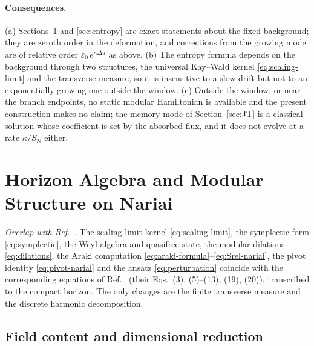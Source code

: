 \documentclass[11pt]{article}
\newcommand{\Nariai}{Nariai}
\begin{document}
\paragraph{Consequences.} (a) Sections~\ref{sec:algebra} and \ref{sec:entropy} are exact statements about the fixed background; they are zeroth order in the deformation, and corrections from the growing mode are of relative order $\varepsilon_0\,e^{\kappa\Delta u}$ as above. (b) The entropy formula depends on the background through two structures, the universal Kay--Wald kernel \eqref{eq:scaling-limit} and the transverse measure, so it is insensitive to a slow drift but not to an exponentially growing one outside the window. (c) Outside the window, or near the branch endpoints, no static modular Hamiltonian is available and the present construction makes no claim; the memory mode of Section~\ref{sec:JT} is a classical solution whose coefficient is set by the absorbed flux, and it does not evolve at a rate $\kappa/S_{\mathrm N}$ either.

\section{Horizon Algebra and Modular Structure on \Nariai{}}
\label{sec:algebra}

\noindent\emph{Overlap with Ref.~\cite{DorauMuch}.} The scaling-limit kernel \eqref{eq:scaling-limit}, the symplectic form \eqref{eq:symplectic}, the Weyl algebra and quasifree state, the modular dilations \eqref{eq:dilations}, the Araki computation \eqref{eq:araki-formula}--\eqref{eq:Srel-nariai}, the pivot identity \eqref{eq:pivot-nariai} and the ansatz \eqref{eq:perturbation} coincide with the corresponding equations of Ref.~\cite{DorauMuch} (their Eqs.~(3), (5)--(13), (19), (20)), transcribed to the compact horizon. The only changes are the finite transverse measure and the discrete harmonic decomposition.

\subsection{Field content and dimensional reduction}
\end{document}
